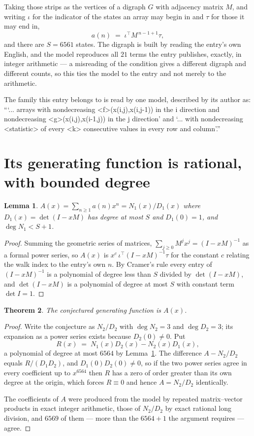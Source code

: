 \documentclass[11pt,a4paper]{article}
\theoremstyle{plain}
\newtheorem{theorem}{Theorem}
\newtheorem{lemma}[theorem]{Lemma}
\theoremstyle{definition}
\begin{document}
Taking those strips as the vertices of a digraph $G$ with adjacency matrix $M$, and writing
$\iota$ for the indicator of the states an array may begin in and $\tau$ for those it may end
in,
\[
a(n)\;=\;\iota^{\!\top}M^{\,n-1+1}\tau ,
\]
and there are $S=6561$ states. The digraph is built by reading the entry's own English, and the
model reproduces all $21$ terms the entry publishes, exactly, in integer arithmetic --- a
misreading of the condition gives a different digraph and different counts, so this ties the
model to the entry and not merely to the arithmetic.

The family this entry belongs to is read by one model, described by its author as: ```... arrays with nondecreasing <f>(x(i,j),x(i,j-1)) in the i direction and nondecreasing <g>(x(i,j),x(i-1,j)) in the j direction' and `... with nondecreasing <statistic> of every <k> consecutive values in every row and column'.''


\section{Its generating function is rational, with bounded degree}

\begin{lemma}\label{lem:rat}
$A(x)=\sum_{n\ge1}a(n)x^n=N_1(x)/D_1(x)$ where $D_1(x)=\det(I-xM)$ has degree at most
$S$ and $D_1(0)=1$, and $\deg N_1<S+1$.
\end{lemma}

\begin{proof}
Summing the geometric series of matrices, $\sum_{j\ge0}M^jx^j=(I-xM)^{-1}$ as a formal
power series, so $A(x)$ is $x^{c}\,\iota^{\!\top}(I-xM)^{-1}\tau$ for the constant $c$
relating the walk index to the entry's own $n$. By Cramer's rule every entry of
$(I-xM)^{-1}$ is a polynomial of degree less than $S$ divided by $\det(I-xM)$, and
$\det(I-xM)$ is a polynomial of degree at most $S$ with constant term $\det I=1$.
\end{proof}

\begin{theorem}
The conjectured generating function is $A(x)$.
\end{theorem}

\begin{proof}
Write the conjecture as $N_2/D_2$ with $\deg N_2=3$ and $\deg D_2=3$; its expansion as a
power series exists because $D_2(0)\neq0$. Put
\[
R(x)\;=\;N_1(x)D_2(x)-N_2(x)D_1(x),
\]
a polynomial of degree at most $6564$ by Lemma~\ref{lem:rat}. The difference
$A-N_2/D_2$ equals $R/(D_1D_2)$, and $D_1(0)D_2(0)\neq0$, so if the two power series agree in
every coefficient up to $x^{6564}$ then $R$ has a zero of order greater than its own
degree at the origin, which forces $R\equiv0$ and hence $A=N_2/D_2$ identically.

The coefficients of $A$ were produced from the model by repeated matrix--vector products in
exact integer arithmetic, those of $N_2/D_2$ by exact rational long division, and $6569$
of them --- more than the $6564+1$ the argument requires --- agree.
\end{proof}
\end{document}
